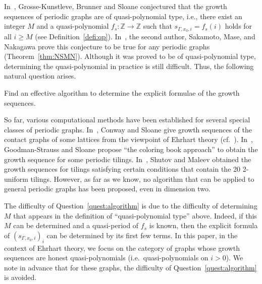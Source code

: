 \documentclass[ALCO,published]{cedram}
\theoremstyle{remark}
\begin{document}
In~\cite{GKBS96}, Grosse-Kunstleve, Brunner and Sloane conjectured 
that the growth sequences of periodic graphs are of quasi-polynomial type, i.e., 
there exist an integer $M$ and a quasi-polynomial $f_s: \mathbb{Z} \to \mathbb{Z}$ such that 
$s_{\Gamma, x_0, i} = f_s(i)$ holds for all $i \ge M$ (see Definition~\ref{defi:qp}). 
In~\cite{NSMN21}, the second author, Sakamoto, Mase, and Nakagawa prove this conjecture to be true for any periodic graphs (Theorem~\ref{thm:NSMN}). 
Although it was proved to be of quasi-polynomial type, determining the quasi-polynomial in practice is still difficult. Thus, the following natural question arises. 

\begin{quest}\label{quest:algorithm}
Find an effective algorithm to determine the explicit formulae of the growth sequences.
\end{quest}



So far, various computational methods have been established for several special classes of periodic graphs. 
In~\cite{CS97}, Conway and Sloane give growth sequences of the contact graphs of 
some lattices from the viewpoint of Ehrhart theory (cf.~\cite{BHV99, ABHPS}). 
In~\cite{GS19}, Goodman-Strauss and Sloane propose ``the coloring book approach'' 
to obtain the growth sequence for some periodic tilings. 
In~\cite{SM19, SM20a}, Shutov and Maleev obtained the growth sequences for 
tilings satisfying certain conditions that contain the 20 2-uniform tilings. 
However, as far as we know, no algorithm that can be applied to general periodic graphs has been proposed, even in dimension two. 

The difficulty of Question~\ref{quest:algorithm} is due to the difficulty of determining $M$ that appears in the definition of ``quasi-polynomial type'' above. 
Indeed, if this $M$ can be determined and a quasi-period of $f_s$ is known, 
then the explicit formula of  $(s_{\Gamma, x_0, i})_i$ can be determined by its first few terms. 
In this paper, in the context of Ehrhart theory, 
we focus on the category of graphs whose growth sequences are honest quasi-polynomials  (i.e.\ quasi-polynomials on $i > 0$). 
We note in advance that for these graphs, the difficulty of Question~\ref{quest:algorithm} is avoided. 
\end{document}
